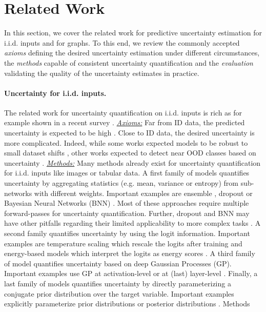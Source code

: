 \section{Related Work}
\label{sec:related_work_009}

In this section, we cover the related work for predictive uncertainty estimation for i.i.d. inputs and for graphs. To this end, we review the commonly accepted \emph{axioms} defining the desired uncertainty estimation under different circumstances, the \emph{methods} capable of consistent uncertainty quantification and the \emph{evaluation} validating the quality of the uncertainty estimates in practice.

\paragraph{Uncertainty for i.i.d. inputs.} The related work for uncertainty quantification on i.i.d. inputs is rich as for example shown in a recent survey \citep{review-uncertainty-dl}. \emph{\underline{Axioms:}} Far from ID data, the predicted uncertainty is expected to be high \citep{provable-uncertainty, NatPN2021, bayesian-a-bit, sufficient-conditions-no-adversarial}. Close to ID data, the desired uncertainty is more complicated. Indeed, while some works expected models to be robust to small dataset shifts \citep{dataset-shift, stutz2020}, other works expected to detect near OOD classes based on uncertainty \citep{contrastive-ood, robustness-uncertainty-dirichlet, attack-detection}. \emph{\underline{Methods:}} Many methods already exist for uncertainty quantification for i.i.d. inputs like images or tabular data. A first family of models quantifies uncertainty by aggregating statistics (e.g. mean, variance or entropy) from sub-networks with different weights. Important examples are ensemble \citep{ensembles, batch-ensembles, hyper-ensembles, mimo-independent-subnetworks}, dropout \citep{Srivastava2014} or Bayesian Neural Networks (BNN) \citep{bayesian-networks, Depeweg2018, simple-baseline-uncertainty, liberty-depth-bnn, rank-1-bnn}. Most of these approaches require multiple forward-passes for uncertainty quantification. Further, dropout and BNN may have other pitfalls regarding their limited applicability to more complex tasks \citep{Osband2016, Hron2018, practical-bnn, expressiveness-bnn}. A second family quantifies uncertainty by using the logit information. Important examples are temperature scaling which rescale the logits after training \citep{calibration-network, Liang2017} and energy-based models which interpret the logits as energy scores \citep{Liu2020a, energy}. A third family of model quantifies uncertainty based on deep Gaussian Processes (GP). Important examples use GP at activation-level \cite{gp-uncertainty-activation} or at (last) layer-level \citep{uncertainty-distance-awareness, bayesian-a-bit, duq, Bilovs2019}. Finally, a last family of models quantifies uncertainty by directly parameterizing a conjugate prior distribution over the target variable. Important examples explicitly parameterize prior distributions \citep{sensoy2018, distribution-distillation, PriorNetworks, reverse-kl, evidential-regression} or posterior distributions \citep{charpentier2020, NatPN2021}. Methods 